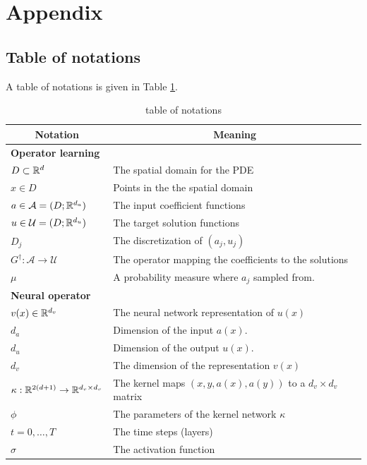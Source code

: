 \documentclass{article} %
\newcommand{\A}{\mathcal{A}}
\newcommand{\U}{\mathcal{U}}
\newcommand{\Ftrue}{G^\dagger}
\begin{document}



\newpage
\appendix
\section{Appendix}

\subsection{Table of notations}
A table of notations is given in Table \ref{table:notations}.

\begin{table}[h]
\caption{table of notations}
\label{table:notations}
\begin{center}
\begin{tabular}{|l|l|}
\multicolumn{1}{c}{\bf Notation} 
&\multicolumn{1}{c}{\bf Meaning}\\
\hline 
{\bf Operator learning} &\\
$D \subset \mathbb{R}^d$  & The spatial domain for the PDE \\
$x \in D$  & Points in the the spatial domain \\
$a \in \A = (D;\R^{d_a})$  & The input coefficient functions \\
$u \in \U = (D;\R^{d_u})$  & The target solution functions \\
$D_j$ & The discretization of $(a_j, u_j)$\\
$\Ftrue: \A \to \U$  & The operator mapping the coefficients to the solutions\\
$\mu$ & A probability measure where $a_j$ sampled from.\\
\hline
{\bf Neural operator} &\\
$v(x) \in \mathbb{R}^{d_v}$  & The neural network representation of $u(x)$ \\
$d_a$ & Dimension of the input $a(x)$.\\
$d_u$ & Dimension of the output $u(x)$.\\
$d_v$ & The dimension of the representation $v(x)$\\
$\kappa : \mathbb{R}^{2(d+1)} \to \mathbb{R}^{d_v \times d_v}$  & The kernel maps $(x,y,a(x),a(y))$ to a $d_v \times d_v$ matrix\\
$\phi$  & The parameters of the kernel network $\kappa$ \\
$t = 0,\ldots,T$  & The time steps (layers)  \\
$\sigma $  & The activation function  \\
\hline 

\end{tabular}
\end{center}
\end{table}
\end{document}

